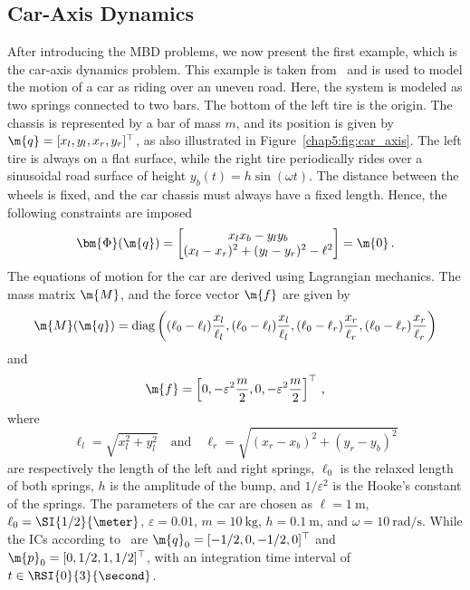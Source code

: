 \subsection{Car-Axis Dynamics}

After introducing the \ac{MBD} problems, we now present the first example, which is the car-axis dynamics problem. This example is taken from~\cite{lioen1998test, mazzia2008test} and is used to model the motion of a car as riding over an uneven road. Here, the system is modeled as two springs connected to two bars. The bottom of the left tire is the origin. The chassis is represented by a bar of mass $m$, and its position is given by $\m{q} = [x_l, y_l, x_r, y_r]^\top$, as also illustrated in Figure~\ref{chap5:fig:car_axis}. The left tire is always on a flat surface, while the right tire periodically rides over a sinusoidal road surface of height $y_b(t) = h\sin(\omega t)$. The distance between the wheels is fixed, and the car chassis must always have a fixed length. Hence, the following constraints are imposed
%
\begin{equation*}
  \bm{\Phi}(\m{q}) = \begin{bmatrix}
    x_l x_b - y_l y_b \\
    (x_l - x_r)^2 + (y_l - y_r)^2 - \ell^2
  \end{bmatrix} = \m{0} \, \text{.}
\end{equation*}
%
The equations of motion for the car are derived using Lagrangian mechanics. The mass matrix $\m{M}$, and the force vector $\m{f}$ are given by
%
\begin{equation*}
  \m{M}(\m{q}) = \mathrm{diag}\left(
    (\ell_0-\ell_l)\dfrac{x_l}{\ell_l},
    (\ell_0-\ell_l)\dfrac{x_l}{\ell_l},
    (\ell_0-\ell_r)\dfrac{x_r}{\ell_r},
    (\ell_0-\ell_r)\dfrac{x_r}{\ell_r}
  \right)
\end{equation*}
%
and
%
\begin{equation*}
  \m{f} = \left[
    0, -\varepsilon^2\dfrac{m}{2},
    0, -\varepsilon^2\dfrac{m}{2}
  \right]^{\top}
  \, \text{,}
\end{equation*}
%
where
%
\begin{equation*}
  \ell_l = \sqrt{x_l^2 + y_l^2}
  \quad \text{and} \quad
  \ell_r = \sqrt{(x_r - x_b)^2 + (y_r - y_b)^2}
\end{equation*}
%
are respectively the length of the left and right springs, $\ell_0$ is the relaxed length of both springs, $h$ is the amplitude of the bump, and $1/\varepsilon^2$ is the Hooke's constant of the springs. The parameters of the car are chosen as $\ell = \SI{1}{\meter}$, $\ell_0 = \SI{1/2}{\meter}$, $\varepsilon = 0.01$, $m = \SI{10}{\kilo\gram}$, $h = \SI{0.1}{\meter}$, and $\omega = \SI{10}{\radian\per\second}$. While the \acp{IC} according to~\cite{lioen1998test, mazzia2008test} are $\m{q}_0 = [-1/2, 0, -1/2, 0]^\top$ and $\m{p}_0 = [0, 1/2, 1, 1/2]^\top$, with an integration time interval of $t \in \RSI{0}{3}{\second}$.

